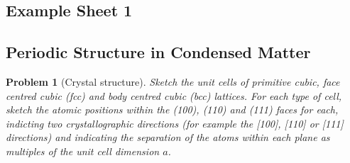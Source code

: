\documentclass[a4paper]{article}
\theoremstyle{new}
\newtheorem{qns}{Problem}[section]
\begin{document}
\subsection{Example Sheet 1}
\subsection*{Periodic Structure in Condensed Matter}
\begin{qns}[Crystal structure]
Sketch the unit cells of primitive cubic, face centred cubic (fcc) and body centred cubic (bcc) lattices. For each type of cell, sketch the atomic positions within the (100), (110) and (111) faces for each, indicting two crystallographic directions (for example the [100], [110] or [111] directions) and indicating the separation of the atoms within each plane as multiples of the unit cell dimension $a$.
\end{qns}
\end{document}
